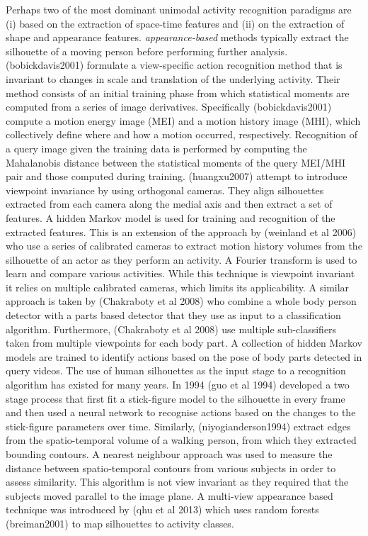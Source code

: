 Perhaps two of the most dominant unimodal activity recognition paradigms are (i) based on the extraction of space-time features and (ii) on the extraction of shape and appearance features. \textit{appearance-based} methods typically extract the silhouette of a moving person before performing further analysis. (bobickdavis2001) formulate a view-specific action recognition method that is invariant to changes in scale and translation of the underlying activity. Their method consists of an initial training phase from which statistical moments are computed from a series of image derivatives. Specifically (bobickdavis2001) compute a motion energy image (MEI) and a motion history image (MHI), which collectively define where and how a motion occurred, respectively. Recognition of a query image given the training data is performed by computing the Mahalanobis distance between the statistical moments of the query MEI/MHI pair and those computed during training. (huangxu2007) attempt to introduce viewpoint invariance by using orthogonal cameras. They align silhouettes extracted from each camera along the medial axis and then extract a set of features. A hidden Markov model is used for training and recognition of the extracted features. This is an extension of the approach by (weinland et al 2006) who use a series of calibrated cameras to extract motion history volumes from the silhouette of an actor as they perform an activity. A Fourier transform is used to learn and compare various activities. While this technique is viewpoint invariant it relies on multiple calibrated cameras, which limits its applicability. A similar approach is taken by (Chakraboty et al 2008) who combine a whole body person detector with a parts based detector that they use as input to a classification algorithm. Furthermore, (Chakraboty et al 2008) use multiple sub-classifiers taken from multiple viewpoints for each body part. A collection of hidden Markov models are trained to identify actions based on the pose of body parts detected in query videos. The use of human silhouettes as the input stage to a recognition algorithm has existed for many years. In 1994 (guo et al 1994) developed a two stage process that first fit a stick-figure model to the silhouette in every frame and then used a neural network to recognise actions based on the changes to the stick-figure parameters over time. Similarly, (niyogianderson1994) extract edges from the spatio-temporal volume of a walking person, from which they extracted bounding contours. A nearest neighbour approach was used to measure the distance between spatio-temporal contours from various subjects in order to assess similarity. This algorithm is not view invariant as they required that the subjects moved parallel to the image plane. A multi-view appearance based technique was introduced by (qhu et al 2013) which uses random forests (breiman2001) to map silhouettes to activity classes.\\

